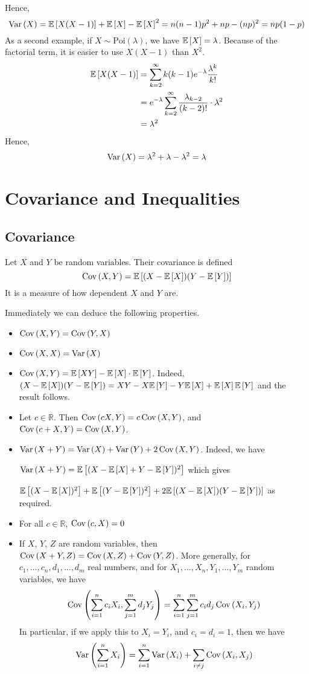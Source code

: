 \documentclass{article}
\begin{document}
Hence,
\[ \Var{X} = \expect{X(X-1)} + \expect{X} - \expect{X}^2 = n(n-1)p^2 + np - (np)^2 = np(1-p) \]
As a second example, if $X \sim \text{Poi}(\lambda)$, we have $\expect{X} = \lambda$. Because of the factorial term, it is easier to use $X(X-1)$ than $X^2$.
\begin{align*}
	\expect{X(X-1)} & = \sum_{k=2}^\infty k(k-1) e^{-\lambda} \frac{\lambda^k}{k!}                  \\
	                & = e^{-\lambda} \sum_{k=2}^\infty \frac{\lambda_{k-2}}{(k-2)!} \cdot \lambda^2 \\
	                & = \lambda^2
\end{align*}
Hence,
\[ \Var{X} = \lambda^2 + \lambda - \lambda^2 = \lambda \]

\section{Covariance and Inequalities}
\subsection{Covariance}
\begin{definition}
	Let $X$ and $Y$ be random variables. Their covariance is defined
	\[ \Cov{X,Y} = \expect{(X - \expect{X})(Y - \expect{Y})} \]
	It is a measure of how dependent $X$ and $Y$ are.
\end{definition}
\noindent Immediately we can deduce the following properties.
\begin{itemize}
	\item $\Cov{X,Y} = \Cov{Y,X}$
	\item $\Cov{X,X} = \Var{X}$
	\item $\Cov{X,Y} = \expect{XY} - \expect{X}\cdot\expect{Y}$. Indeed, $(X - \expect{X})(Y - \expect{Y}) = XY - X\expect{Y} - Y\expect{X} + \expect{X}\expect{Y}$ and the result follows.
	\item Let $c \in \mathbb R$. Then $\Cov{cX,Y} = c\Cov{X,Y}$, and $\Cov{c + X,Y} = \Cov{X,Y}$.
	\item $\Var{X + Y} = \Var{X} + \Var{Y} + 2\Cov{X,Y}$. Indeed, we have

	      $\Var{X + Y} = \expect{(X - \expect{X} + Y - \expect{Y})^2}$ which gives

	      $\expect{(X - \expect{X})^2} + \expect{(Y - \expect{Y})^2} + 2\expect{(X - \expect{X})(Y - \expect{Y})}$ as required.
	\item For all $c \in \mathbb R$, $\Cov{c, X} = 0$
	\item If $X$, $Y$, $Z$ are random variables, then $\Cov{X + Y,Z} = \Cov{X,Z} + \Cov{Y,Z}$. More generally, for $c_1, \dots, c_n, d_1, \dots, d_m$ real numbers, and for $X_1, \dots, X_n, Y_1, \dots, Y_m$ random variables, we have
	      \[ \Cov{\sum_{i=1}^n c_i X_i,\sum_{j=1}^m d_j Y_j} = \sum_{i=1}^n \sum_{j=1}^m c_i d_j \Cov{X_i,Y_j} \]
	      In particular, if we apply this to $X_i = Y_i$, and $c_i = d_i = 1$, then we have
	      \[ \Var{\sum_{i=1}^n X_i} = \sum_{i=1}^n \Var{X_i} + \sum_{i \neq j} \Cov{X_i,X_j} \]
\end{itemize}
\end{document}
